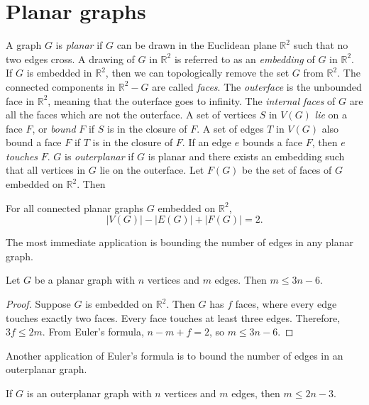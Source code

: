 \section{Planar graphs}\label{sec:Planar graphs}
A graph \(G\) is \textit{planar} if \(G\) can be drawn in the Euclidean plane \( \mathbb{R}^2 \) such that no two edges cross. A drawing of $G$ in $\mathbb{R}^2$ is referred to as an \textit{embedding} of $G$ in $\mathbb{R}^2$. If \(G\) is embedded in \(\mathbb{R}^2 \), then we can topologically remove the set $G$ from $\mathbb{R}^2$. The connected components in $\mathbb{R}^2 - G$ are called \textit{faces}. The \textit{outerface} is the unbounded face in $\mathbb{R}^2$, meaning that the outerface goes to infinity. The \textit{internal faces} of $G$ are all the faces which are not the outerface. A set of vertices $S$ in $V(G)$ \textit{lie} on a face $F$, or \textit{bound} $F$ if $S$ is in the closure of $F$. A set of edges $T$ in $V(G)$ also bound a face $F$ if $T$ is in the closure of $F$. If an edge $e$ bounds a face $F$, then $e$ \textit{touches} $F$. \(G\) is \textit{outerplanar} if \(G\) is planar and there exists an embedding such that all vertices in \(G\) lie on the outerface.
Let \(F(G)\) be the set of faces of \(G\) embedded on \(\mathbb{R}^2\). Then
\begin{theorem}\label{thm:Euler_planar}
	For all connected planar graphs $G$ embedded on $\mathbb{R}^2$,
	\begin{equation}
		|V(G)| - |E(G)| + |F(G)| = 2.
	\end{equation}
\end{theorem}

The most immediate application is bounding the number of edges in any planar graph.
\begin{theorem}\label{thm:planar_graph_edge_bound}
	Let $G$ be a planar graph with $n$ vertices and $m$ edges. Then $m \leq 3n - 6$.
\end{theorem}
\begin{proof}
	Suppose $G$ is embedded on $\mathbb{R}^2$. Then $G$ has $f$ faces, where every edge touches exactly two faces. Every face touches at least three edges. Therefore, $3f \leq 2m$. From Euler's formula, $n - m + f = 2$, so $m \leq 3n - 6$. 
\end{proof}

Another application of Euler's formula is to bound the number of edges in an outerplanar graph.
\begin{theorem}\label{thm:outerplanar_bound}
	If \(G\) is an outerplanar graph with \(n\) vertices and \(m\) edges, then \(m \leq 2n - 3\).
\end{theorem}

